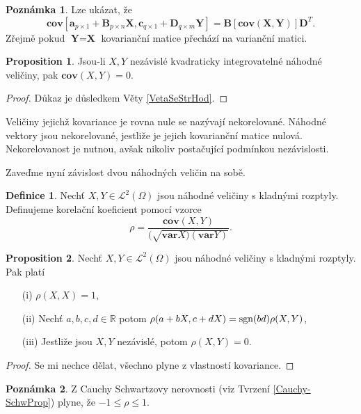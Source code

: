 \documentclass[a4]{report}
\theoremstyle{definition}
\newtheorem{definition}{Definice}[section]
\newtheorem{remark}{Poznámka}[section]
\newtheorem{proposition}{Proposition}[section]
\begin{document}
{\begin{remark}
Lze ukázat, že 
\begin{equation}
\mathbf{cov}[\textbf{a}_{p \times 1} + \textbf{B}_{p \times n}\textbf{X}, \textbf{c}_{q \times 1} + \textbf{D}_{q \times m}\textbf{Y}] = \textbf{B}[\mathbf{cov}(\textbf{X}, \textbf{Y})]\textbf{D}^{T}.
\end{equation}
Zřejmě pokud $\textbf{Y} = \textbf{X}$ kovarianční matice přechází na varianční matici.
\end{remark}

\begin{proposition}
Jsou-li $X, Y$ nezávislé kvadraticky integrovatelné náhodné veličiny, pak $\mathbf{cov}(X, Y) = 0$. 
\end{proposition}
\begin{proof}
Důkaz je důsledkem Věty \ref{VetaSeStrHod}.
\end{proof}
Veličiny jejichž kovariance je rovna nule se nazývají nekorelované. Náhodné vektory jsou nekorelované, jestliže je jejich kovarianční matice nulová. Nekorelovanost je nutnou, avšak nikoliv postačující podmínkou nezávislosti.

Zaveďme nyní závislost dvou náhodných veličin na sobě.
\begin{definition}
Nechť $X, Y \in \mathcal{L}^{2}(\Omega)$ jsou náhodné veličiny s kladnými rozptyly. Definujeme korelační koeficient pomocí vzorce
\begin{equation}
\rho =  \frac{\mathbf{cov}(X,Y)}{(\sqrt{\mathbf{var}X) (\mathbf{var}Y)}}.
\end{equation}
\end{definition}

\begin{proposition}
Nechť $X, Y \in \mathcal{L}^{2}(\Omega)$ jsou náhodné veličiny s kladnými rozptyly. Pak platí
\begin{itemize}
\item[(i)] $\rho(X, X) = 1$,
\item[(ii)] Nechť $a, b, c, d \in \mathbb{R}$ potom $\rho(a + bX, c + dX) = \textup{sgn}(bd)\rho(X, Y)$,
\item[(iii)] Jestliže jsou $X, Y$ nezávislé, potom $\rho(X, Y) = 0$.
\end{itemize}
\end{proposition}
\begin{proof}
Se mi nechce dělat, všechno plyne z vlastností kovariance.
\end{proof}
\begin{remark}
Z Cauchy Schwartzovy nerovnosti (viz Tvrzení \ref{Cauchy-SchwProp}) plyne, že $-1 \leq \rho \leq 1$.
\end{remark}

}
\end{document}
